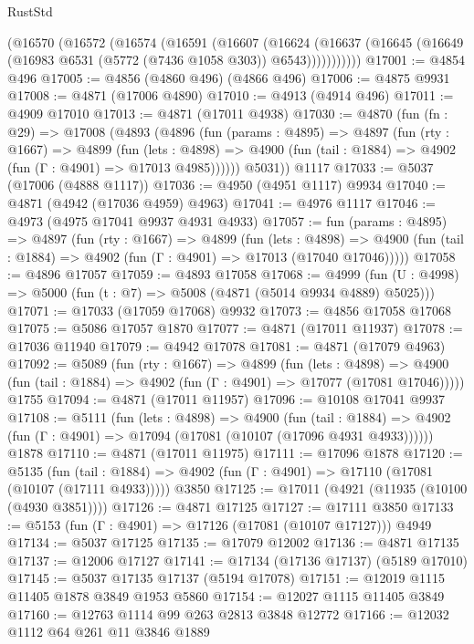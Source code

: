 \begin{lexlean}{RustStd}
\begin{coremodule}
      (@16570
        (@16572
          (@16574
            (@16591
              (@16607
                (@16624
                  (@16637 (@16645 (@16649 (@16983 @6531 (@5772 (@7436 @1058 @303)) @6543)))))))))))
@17001 := @4854 @496
@17005 := @4856 (@4860 @496) (@4866 @496)
@17006 := @4875 @9931
@17008 := @4871 (@17006 @4890)
@17010 := @4913 (@4914 @496)
@17011 := @4909 @17010
@17013 := @4871 (@17011 @4938)
@17030 := @4870
    (fun (fn : @29) =>
    @17008
      (@4893
        (@4896
          (fun (params : @4895) =>
          @4897
            (fun (rty : @1667) =>
            @4899
              (fun (lets : @4898) =>
              @4900 (fun (tail : @1884) => @4902 (fun (Γ : @4901) => @17013 @4985))))))
        @5031))
    @1117
@17033 := @5037 (@17006 (@4888 @1117))
@17036 := @4950 (@4951 @1117) @9934
@17040 := @4871 (@4942 (@17036 @4959) @4963)
@17041 := @4976 @1117
@17046 := @4973 (@4975 @17041 @9937 @4931 @4933)
@17057 := fun (params : @4895) =>
  @4897
    (fun (rty : @1667) =>
    @4899
      (fun (lets : @4898) =>
      @4900 (fun (tail : @1884) => @4902 (fun (Γ : @4901) => @17013 (@17040 @17046)))))
@17058 := @4896 @17057
@17059 := @4893 @17058
@17068 := @4999 (fun (U : @4998) => @5000 (fun (t : @7) => @5008 (@4871 (@5014 @9934 @4889) @5025)))
@17071 := @17033 (@17059 @17068) @9932
@17073 := @4856 @17058 @17068
@17075 := @5086 @17057 @1870
@17077 := @4871 (@17011 @11937)
@17078 := @17036 @11940
@17079 := @4942 @17078
@17081 := @4871 (@17079 @4963)
@17092 := @5089
    (fun (rty : @1667) =>
    @4899
      (fun (lets : @4898) =>
      @4900 (fun (tail : @1884) => @4902 (fun (Γ : @4901) => @17077 (@17081 @17046)))))
    @1755
@17094 := @4871 (@17011 @11957)
@17096 := @10108 @17041 @9937
@17108 := @5111
    (fun (lets : @4898) =>
    @4900
      (fun (tail : @1884) =>
      @4902 (fun (Γ : @4901) => @17094 (@17081 (@10107 (@17096 @4931 @4933))))))
    @1878
@17110 := @4871 (@17011 @11975)
@17111 := @17096 @1878
@17120 := @5135
    (fun (tail : @1884) => @4902 (fun (Γ : @4901) => @17110 (@17081 (@10107 (@17111 @4933)))))
    @3850
@17125 := @17011 (@4921 (@11935 (@10100 (@4930 @3851))))
@17126 := @4871 @17125
@17127 := @17111 @3850
@17133 := @5153 (fun (Γ : @4901) => @17126 (@17081 (@10107 @17127))) @4949
@17134 := @5037 @17125
@17135 := @17079 @12002
@17136 := @4871 @17135
@17137 := @12006 @17127
@17141 := @17134 (@17136 @17137) (@5189 @17010)
@17145 := @5037 @17135 @17137 (@5194 @17078)
@17151 := @12019 @1115 @11405 @1878 @3849 @1953 @5860
@17154 := @12027 @1115 @11405 @3849
@17160 := @12763 @1114 @99 @263 @2813 @3848 @12772
@17166 := @12032 @1112 @64 @261 @11 @3846 @1889

\end{coremodule}
\end{lexlean}
